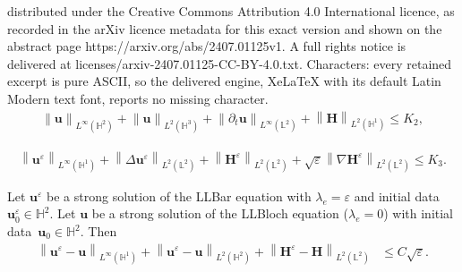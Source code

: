 \documentclass[10pt,a4paper]{amsart}
\newcommand{\bb}{\mathbb}
\newcommand{\bff}{\boldsymbol}
\newcommand{\norm}[2]{\left\|{#1}\right\|_{#2}}
\begin{document}
distributed under the Creative Commons Attribution 4.0 International licence, as recorded in the arXiv licence metadata for this exact version and shown on the abstract page https://arxiv.org/abs/2407.01125v1. A full rights notice is delivered at licenses/arxiv-2407.01125-CC-BY-4.0.txt. Characters: every retained excerpt is pure ASCII, so the delivered engine, XeLaTeX with its default Latin Modern text font, reports no missing character.
\begin{align}\label{equ:u H bloch H2}
	\norm{\bff{u}}{L^\infty(\bb{H}^2)} + \norm{\bff{u}}{L^2(\bb{H}^3)} +
	\norm{\partial_t \bff{u}}{L^\infty(\bb{L}^2)} + \norm{\bff{H}}{L^2(\bb{H}^1)} \leq K_2,
\end{align}

\begin{align}\label{equ:ue est}
	\norm{\bff{u}^\varepsilon}{L^\infty(\bb{H}^1)} 
	+
	\norm{\Delta \bff{u}^\varepsilon}{L^2(\bb{L}^2)}
	+
	\norm{\bff{H}^\varepsilon}{L^2(\bb{L}^2)}
	+
	\sqrt{\varepsilon} \norm{\nabla \bff{H}^\varepsilon}{L^2(\bb{L}^2)}
	\leq
	K_3.
\end{align}

\begin{theorem}\label{the:bloch to bar}
Let $\bff{u}^\varepsilon$ be a strong solution of the LLBar equation with $\lambda_e=\varepsilon$ and initial data $\bff{u}_0^\varepsilon\in \bb{H}^2$. Let $\bff{u}$ be a strong solution of the LLBloch equation ($\lambda_e=0$) with initial data~$\bff{u}_0\in \bb{H}^2$. Then
\begin{align}\label{equ:est ue u H1}
	\norm{\bff{u}^\varepsilon-\bff{u}}{L^\infty(\bb{H}^1)}
	+
	\norm{\bff{u}^\varepsilon-\bff{u}}{L^2(\bb{H}^2)}
	+
	\norm{\bff{H}^\varepsilon-\bff{H}}{L^2(\bb{L}^2)}
	&\leq
	C \sqrt{\varepsilon}.
\end{align}
\end{theorem}
\end{document}
